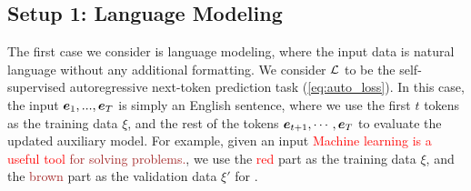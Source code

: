 




\subsection{Setup 1: Language Modeling}
The first case we consider is language modeling, where the input data is natural language without any additional formatting. We consider $\mathcal{L}$ to be the self-supervised autoregressive next-token prediction task (\cref{eq:auto_loss}). In this case, the input $\ve_1,...,\ve_T$ is simply an English sentence, where we use the first $t$ tokens as the training data $\xi$, and the rest of the tokens $\ve_{t+1}, \cdots, \ve_T$ to evaluate the updated auxiliary model. For example, given an input \textcolor{red}{Machine learning is a useful tool} \textcolor{brown}{for solving problems.}, we use the \textcolor{red}{red} part as the training data $\xi$, and the \textcolor{brown}{brown} part as the validation data $\xi'$ for \simulator{}. 


